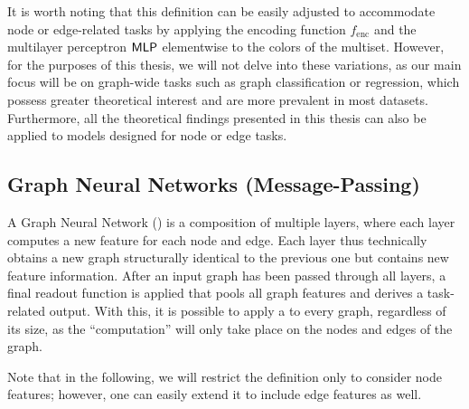 It is worth noting that this definition can be easily adjusted to accommodate node or edge-related tasks by applying the encoding function $f_\text{enc}$ and the multilayer perceptron $\textsf{MLP}$ elementwise to the colors of the multiset. However, for the purposes of this thesis, we will not delve into these variations, as our main focus will be on graph-wide tasks such as graph classification or regression, which possess greater theoretical interest and are more prevalent in most datasets. Furthermore, all the theoretical findings presented in this thesis can also be applied to \wlnn models designed for node or edge tasks.

\subsection{Graph Neural Networks (Message-Passing)}\label{sec:GNN Defintion}
A \textsf{Graph Neural Network} (\gnn) is a composition of multiple layers, where each layer computes a new feature for each node and edge. Each \gnn layer thus technically obtains a new graph structurally identical to the previous one but contains new feature information. After an input graph has been passed through all layers, a final readout function is applied that pools all graph features and derives a task-related output. With this, it is possible to apply a \gnn to every graph, regardless of its size, as the ``computation'' will only take place on the nodes and edges of the graph.

Note that in the following, we will restrict the definition only to consider node features; however, one can easily extend it to include edge features as well.

